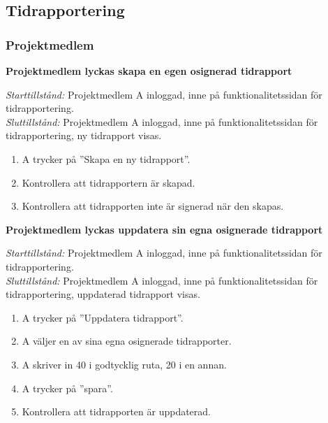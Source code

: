 \documentclass[a4paper]{article}
\begin{document}

\subsection{Tidrapportering}

\subsubsection{Projektmedlem}

\begin{FT}


\item
\textbf{Projektmedlem lyckas skapa en egen osignerad tidrapport}

\emph{Starttillstånd:} Projektmedlem A inloggad, inne på funktionalitetssidan för tidrapportering.\\
\emph{Sluttillstånd:} Projektmedlem A inloggad, inne på funktionalitetssidan för tidrapportering, ny tidrapport visas.

\begin{enumerate}
\item A trycker på ''Skapa en ny tidrapport''.
\item Kontrollera att tidrapportern är skapad.
\item Kontrollera att tidrapporten inte är signerad när den skapas.
\end{enumerate}

\item
\textbf{Projektmedlem lyckas uppdatera sin egna osignerade tidrapport}

\emph{Starttillstånd:} Projektmedlem A inloggad, inne på funktionalitetssidan för tidrapportering.\\
\emph{Sluttillstånd:} Projektmedlem A inloggad, inne på funktionalitetssidan för tidrapportering, uppdaterad tidrapport visas.

\begin{enumerate}
\item A trycker på ''Uppdatera tidrapport''.
\item A väljer en av sina egna osignerade tidrapporter.
\item A skriver in 40 i godtycklig ruta, 20 i en annan.
\item A trycker på ''spara''.
\item Kontrollera att tidrapporten är uppdaterad.
\end{enumerate}


\end{FT}
\end{document}
